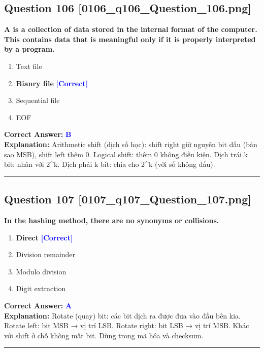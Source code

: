 \documentclass[11pt,a4paper]{article}
\begin{document}
\begin{minipage}{\textwidth}
\subsection*{Question 106 \quad \footnotesize{[0106\_q106\_Question\_106.png]}}
\noindent \textbf{A is a collection of data stored in the internal format of the computer. This contains data that is meaningful only if it is properly interpreted by a program.}

\begin{enumerate}[label=\Alph*.]
    \item Text file
    \item \textbf{Bianry file} \hfill \textcolor{blue}{\textbf{[Correct]}}
    \item Sequential file
    \item EOF
\end{enumerate}

\noindent \textbf{Correct Answer:} \textcolor{blue}{\textbf{B}} \\[2pt]
\noindent \textbf{Explanation:} Arithmetic shift (dịch số học): shift right giữ nguyên bit dấu (bản sao MSB), shift left thêm 0. Logical shift: thêm 0 không điều kiện. Dịch trái k bit: nhân với 2\textasciicircum{}k. Dịch phải k bit: chia cho 2\textasciicircum{}k (với số không dấu).

\par\vspace{0.3cm}
\hrule
\vspace{0.3cm}
\end{minipage}

\begin{minipage}{\textwidth}
\subsection*{Question 107 \quad \footnotesize{[0107\_q107\_Question\_107.png]}}
\noindent \textbf{In the hashing method, there are no synonyms or collisions.}

\begin{enumerate}[label=\Alph*.]
    \item \textbf{Direct} \hfill \textcolor{blue}{\textbf{[Correct]}}
    \item Division remainder
    \item Modulo division
    \item Digit extraction
\end{enumerate}

\noindent \textbf{Correct Answer:} \textcolor{blue}{\textbf{A}} \\[2pt]
\noindent \textbf{Explanation:} Rotate (quay) bit: các bit dịch ra được đưa vào đầu bên kia. Rotate left: bit MSB → vị trí LSB. Rotate right: bit LSB → vị trí MSB. Khác với shift ở chỗ không mất bit. Dùng trong mã hóa và checksum.

\par\vspace{0.3cm}
\hrule
\vspace{0.3cm}
\end{minipage}
\end{document}
